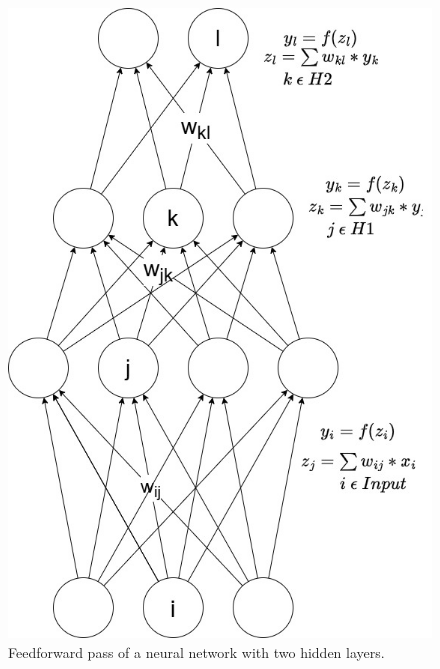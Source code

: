 \begin{figure}[ht]
    \centering 
    \includegraphics[width=0.6\linewidth]{figures/neural_net.jpg}
    \caption{Feedforward pass of a neural network with two hidden layers.} 
    \label{fig:forward_pass}
\end{figure}

